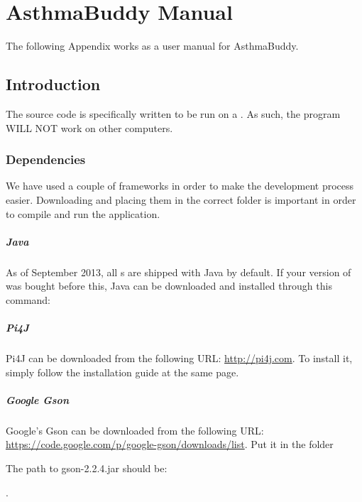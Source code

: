 \chapter{AsthmaBuddy Manual}
\label{app:asthmabuddy_manual}

The following Appendix works as a user manual for AsthmaBuddy.

\section{Introduction}
The source code is specifically written to be run on a \rpi{}. As such, the program WILL NOT work on other computers.

\subsection{Dependencies}
\label{sec:dependencies} 
We have used a couple of frameworks in order to make the development process easier. Downloading and placing them in the correct folder is important in order to compile and run the application. 

\paragraph{Java}
As of September 2013, all \rpi{}s are shipped with Java by default. If your version of \rpi{} was bought before this, Java can be downloaded and installed through this command: 


\paragraph{Pi4J}
Pi4J can be downloaded from the following URL: \url{http://pi4j.com}. To install it, simply follow the installation guide at the same page. 

\paragraph{Google Gson}
Google's Gson can be downloaded from the following URL: \url{https://code.google.com/p/google-gson/downloads/list}. Put it in the folder 


The path to gson-2.2.4.jar should be:

.

